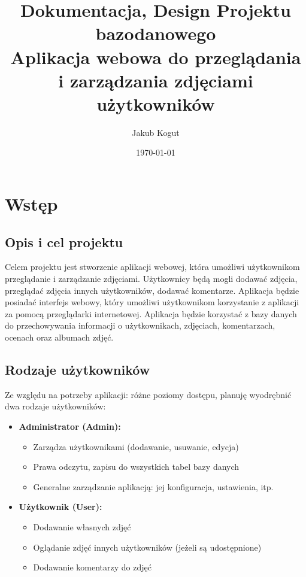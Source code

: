 \documentclass[12pt,a4paper]{article}
\title{Dokumentacja, Design Projektu bazodanowego \\
        \large Aplikacja webowa do przeglądania i zarządzania zdjęciami użytkowników}
\author{Jakub Kogut}
\date{\today}
\begin{document}
\maketitle
\tableofcontents
\newpage

\section{Wstęp}
\subsection{Opis i cel projektu}
Celem projektu jest stworzenie aplikacji webowej, która umożliwi użytkownikom przeglądanie i zarządzanie zdjęciami. Użytkownicy będą mogli dodawać zdjęcia, przeglądać zdjęcia innych użytkowników, dodawać komentarze. Aplikacja będzie posiadać interfejs webowy, który umożliwi użytkownikom korzystanie z aplikacji za pomocą przeglądarki internetowej. Aplikacja będzie korzystać z bazy danych do przechowywania informacji o użytkownikach, zdjęciach, komentarzach, ocenach oraz albumach zdjęć.

\subsection{Rodzaje użytkowników}
Ze względu na potrzeby aplikacji: różne poziomy dostępu, planuję wyodrębnić dwa rodzaje użytkowników:
\begin{itemize}
    \item \textbf{Administrator (Admin):}
    \begin{itemize}
        \item Zarządza użytkownikami (dodawanie, usuwanie, edycja)
        \item Prawa odczytu, zapisu do wszystkich tabel bazy danych
        \item Generalne zarządzanie aplikacją: jej konfiguracja, ustawienia, itp.
    \end{itemize}
    \item \textbf{Użytkownik (User):}
    \begin{itemize}
        \item Dodawanie własnych zdjęć
        \item Oglądanie zdjęć innych użytkowników (jeżeli są udostępnione)
        \item Dodawanie komentarzy do zdjęć
    \end{itemize}
\end{itemize}
\end{document}
